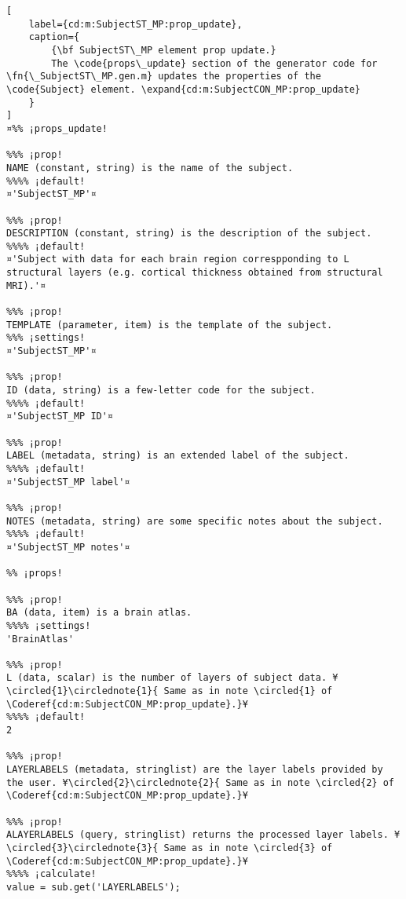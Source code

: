 \documentclass{tufte-handout}
\begin{document}
\begin{lstlisting}[
	label={cd:m:SubjectST_MP:prop_update},
	caption={
		{\bf SubjectST\_MP element prop update.}
		The \code{props\_update} section of the generator code for \fn{\_SubjectST\_MP.gen.m} updates the properties of the \code{Subject} element. \expand{cd:m:SubjectCON_MP:prop_update}
	}
]
¤%% ¡props_update!

%%% ¡prop!
NAME (constant, string) is the name of the subject.
%%%% ¡default!
¤'SubjectST_MP'¤

%%% ¡prop!
DESCRIPTION (constant, string) is the description of the subject.
%%%% ¡default!
¤'Subject with data for each brain region correspponding to L structural layers (e.g. cortical thickness obtained from structural MRI).'¤

%%% ¡prop!
TEMPLATE (parameter, item) is the template of the subject.
%%% ¡settings!
¤'SubjectST_MP'¤

%%% ¡prop!
ID (data, string) is a few-letter code for the subject.
%%%% ¡default!
¤'SubjectST_MP ID'¤

%%% ¡prop!
LABEL (metadata, string) is an extended label of the subject.
%%%% ¡default!
¤'SubjectST_MP label'¤

%%% ¡prop!
NOTES (metadata, string) are some specific notes about the subject.
%%%% ¡default!
¤'SubjectST_MP notes'¤

%% ¡props!

%%% ¡prop!
BA (data, item) is a brain atlas.
%%%% ¡settings!
'BrainAtlas'

%%% ¡prop!
L (data, scalar) is the number of layers of subject data. ¥\circled{1}\circlednote{1}{ Same as in note \circled{1} of \Coderef{cd:m:SubjectCON_MP:prop_update}.}¥
%%%% ¡default!
2

%%% ¡prop!
LAYERLABELS (metadata, stringlist) are the layer labels provided by the user. ¥\circled{2}\circlednote{2}{ Same as in note \circled{2} of \Coderef{cd:m:SubjectCON_MP:prop_update}.}¥

%%% ¡prop!
ALAYERLABELS (query, stringlist) returns the processed layer labels. ¥\circled{3}\circlednote{3}{ Same as in note \circled{3} of \Coderef{cd:m:SubjectCON_MP:prop_update}.}¥
%%%% ¡calculate!
value = sub.get('LAYERLABELS');


\end{lstlisting}
\end{document}
